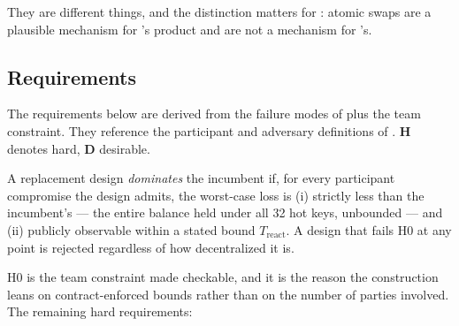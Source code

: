 \noindent They are different things, and the distinction matters for
: atomic swaps are a plausible mechanism for \FusionX's product and
are not a mechanism for \Fusion's.

\subsection{Requirements}
\label{sec:bridging-requirements}

The requirements below are derived from the failure modes of  plus the
team constraint. They reference the participant and adversary definitions of
. \textbf{H} denotes hard, \textbf{D} desirable.

\begin{definition}
\label{def:h0}
A replacement design \emph{dominates} the incumbent if, for every participant compromise the design
admits, the worst-case loss is (i) strictly less than the incumbent's --- the entire balance held
under all 32 hot keys, unbounded --- and (ii) publicly observable within a stated bound
$T_{\mathrm{react}}$. A design that fails H0 at any point is rejected regardless of how decentralized
it is.
\end{definition}

\noindent H0 is the team constraint made checkable, and it is the reason the construction leans on
contract-enforced bounds rather than on the number of parties involved. The remaining hard
requirements:

